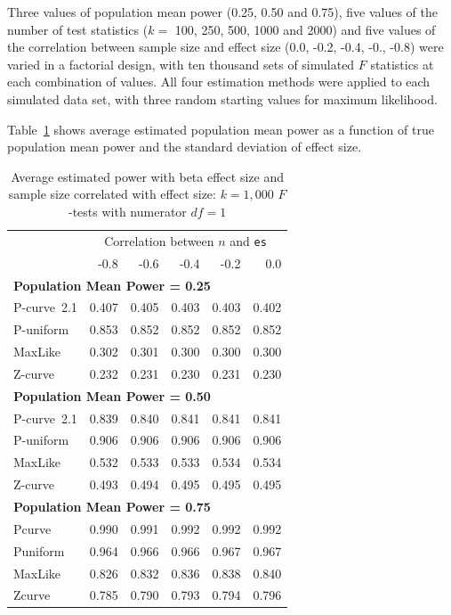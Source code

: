 \documentclass[jou]{apa6} %
\begin{document}
Three values of population mean power (0.25, 0.50 and 0.75), five values of the number of test statistics  ($k=$ 100, 250, 500, 1000 and 2000) and five values of the correlation between sample size and effect size (0.0, -0.2, -0.4, -0., -0.8) were varied in a factorial design, with ten thousand sets of simulated $F$ statistics at each combination of values. All four estimation methods were applied to each simulated data set, with three random starting values for maximum likelihood. 

Table~\ref{betacorrmean} shows average estimated population mean power as a function of true population mean power and the standard deviation of effect size. 
\begin{table} %
\caption{Average estimated power with beta effect size and sample size correlated with effect size: $k = 1,000$ $F$-tests with numerator $df=1$}
{\small
\begin{center}
\begin{tabular}{lrrrrr}  \hline
& \multicolumn{5}{c}{Correlation between $n$ and \texttt{es}} \\ 
& -0.8 & -0.6 & -0.4 & -0.2 & 0.0 \\ \hline
\multicolumn{6}{l}{\textbf{Population Mean Power = 0.25}} \\ \hline
P-curve~2.1   & 0.407  & 0.405  & 0.403  & 0.403  & 0.402  \\
P-uniform & 0.853  & 0.852  & 0.852  & 0.852  & 0.852  \\
MaxLike   & 0.302  & 0.301  & 0.300  & 0.300  & 0.300   \\
Z-curve   & 0.232  & 0.231  & 0.230  & 0.231  & 0.230  \\ \hline
\multicolumn{6}{l}{\textbf{Population Mean Power = 0.50}} \\ \hline
P-curve~2.1   & 0.839  & 0.840  & 0.841  & 0.841  & 0.841   \\
P-uniform & 0.906  & 0.906  & 0.906  & 0.906  & 0.906   \\
MaxLike   & 0.532  & 0.533  & 0.533  & 0.534  & 0.534   \\
Z-curve   & 0.493  & 0.494  & 0.495  & 0.495  & 0.495   \\ \hline
\multicolumn{6}{l}{\textbf{Population Mean Power = 0.75}} \\ \hline
Pcurve   & 0.990  & 0.991  & 0.992  & 0.992  & 0.992    \\
Puniform & 0.964  & 0.966  & 0.966  & 0.967  & 0.967     \\
MaxLike  & 0.826  & 0.832  & 0.836  & 0.838  & 0.840    \\
Zcurve   & 0.785  & 0.790  & 0.793  & 0.794  & 0.796    \\ \hline
\end{tabular}
\end{center}
} %
\label{betacorrmean}  %
\end{table}
\end{document}
